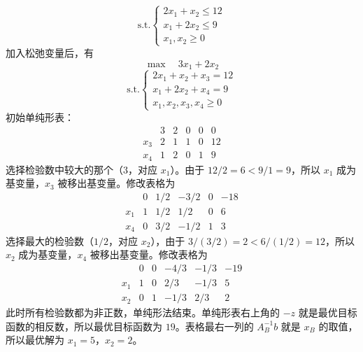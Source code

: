$$
\text{s.t.} 
\begin{cases}
    2x_1 + x_2 \le 12 \\
    x_1 + 2x_2 \le 9 \\
    x_1, x_2 \ge 0
\end{cases}
$$
加入松弛变量后，有
$$
\max \quad 3x_1 + 2x_2
$$
$$
\text{s.t.} 
\begin{cases}
    2x_1 + x_2 + x_3 = 12 \\
    x_1 + 2x_2 + x_4 = 9 \\
    x_1, x_2, x_3, x_4 \ge 0
\end{cases}
$$
初始单纯形表：
$$
\begin{array}{c|cccc|c} & 3 & 2 & 0 & 0 & 0 \\ \hline x_3 & 2 & 1 & 1 & 0 & 12 \\ x_4 & 1 & 2 & 0 & 1 & 9 \end{array}
$$
选择检验数中较大的那个（$3$，对应 $x_1$）。由于 $12/2 = 6 < 9/1 = 9$，所以 $x_1$ 成为基变量，$x_3$ 被移出基变量。修改表格为
$$
\begin{array}{c|cccc|c} & 0 & 1/2 & -3/2 & 0 & -18 \\ \hline x_1 & 1 & 1/2 & 1/2 & 0 & 6 \\ x_4 & 0 & 3/2 & -1/2 & 1 & 3 \end{array}
$$
选择最大的检验数（$1/2$，对应 $x_2$），由于 $3/(3/2) = 2 < 6/(1/2) = 12$，所以 $x_2$ 成为基变量，$x_4$ 被移出基变量。修改表格为
$$
\begin{array}{c|cccc|c} & 0 & 0 & -4/3 & -1/3 & -19 \\ \hline x_1 & 1 & 0 & 2/3 & -1/3 & 5 \\ x_2 & 0 & 1 & -1/3 & 2/3 & 2 \end{array}
$$
此时所有检验数都为非正数，单纯形法结束。单纯形表右上角的 $-z$ 就是最优目标函数的相反数，所以最优目标函数为 $19$。表格最右一列的 $A_B^{-1}b$ 就是 $x_B$ 的取值，所以最优解为 $x_1 = 5$，$x_2 = 2$。

